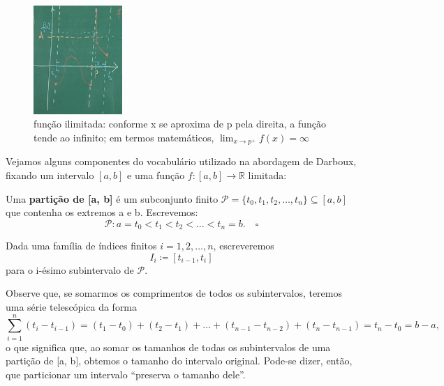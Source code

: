 \documentclass[../analysisII_notes.tex]{subfiles}
\begin{document}
\begin{figure}[H]
	\begin{center}
		\includegraphics[height=0.3\textheight, width=0.3\textwidth, keepaspectratio]{./Images/unbounded_03.png}
	\end{center}
	\caption{função ilimitada: conforme x se aproxima de p pela direita, a função tende ao infinito; em termos matemáticos, \(\lim_{x\to p^{+}}f(x)=\infty\)}
	\label{ubdd03}
\end{figure}

Vejamos alguns componentes do vocabulário utilizado na abordagem de Darboux, fixando um intervalo \([a, b]\) e uma função \(f:[a, b]\rightarrow \mathbb{R}\) limitada:
\begin{def*}
	Uma \textbf{partição de [a, b]} é um subconjunto finito \(\mathcal{P} = \{t_{0}, t_1, t_2, \dotsc , t_{n}\}\subseteq [a, b]\) que contenha os extremos a e b. Escrevemos:
	\[
		\mathcal{P}: a = t_{0}<t_1 <t_2 <\dotsc <t_{n}=b.\quad \square
	\]
\end{def*}
Dada uma família de índices finitos \(i = 1, 2, \dotsc , n\), escreveremos
\[
	I_{i}\coloneqq [t_{i-1}, t_{i}]
\]
para o i-ésimo subintervalo de \(\mathcal{P}\).

Observe que, se somarmos os comprimentos de todos os subintervalos, teremos uma série telescópica da forma
\[
	\sum\limits_{i=1}^{n}(t_{i}-t_{i-1}) = (t_1 - t_{0}) + (t_2 - t_1) + \dotsc + (t_{n-1} - t_{n-2}) + (t_{n} - t_{n-1}) = t_{n} - t_{0} = b - a,
\]
o que significa que, ao somar os tamanhos de todas os subintervalos de uma partição de [a, b], obtemos o tamanho do intervalo original.
Pode-se dizer, então, que particionar um intervalo ``preserva o tamanho dele''.
\end{document}
